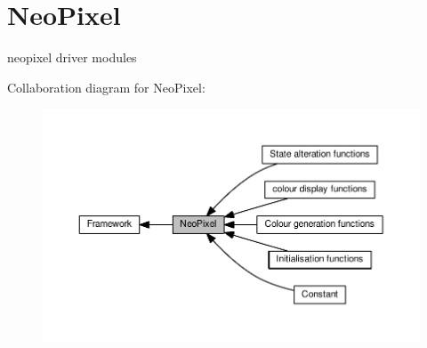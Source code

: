 \hypertarget{group___neo_pixel}{}\section{Neo\+Pixel}
\label{group___neo_pixel}


neopixel driver modules  


Collaboration diagram for Neo\+Pixel\+:\nopagebreak
\begin{figure}[H]
\begin{center}
\leavevmode
\includegraphics[width=350pt]{df/d1f/group___neo_pixel}
\end{center}
\end{figure}
